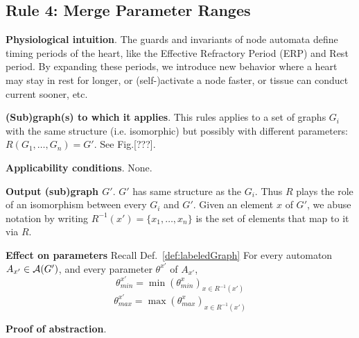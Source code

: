 
%
%

\subsection{Rule 4: Merge Parameter Ranges}
\textbf{Physiological intuition}. 
The guards and invariants of node automata define timing periods of the heart, like the Effective Refractory Period (ERP) and Rest period. 
By expanding these periods, we introduce new behavior where a heart may stay in rest for longer, or (self-)activate a node faster, or tissue can conduct current sooner, etc.

\textbf{(Sub)graph(s) to which it applies}.
This rules applies to a set of graphs $G_i$ with the same structure (i.e. isomorphic) but possibly with different parameters: $R(G_1,\ldots,G_n) = G'$.
See Fig.[???].

\textbf{Applicability conditions}.
None.

\textbf{Output (sub)graph $G'$}.
$G'$ has same structure as the $G_i$.
Thus $R$ plays the role of an isomorphism between every $G_i$ and $G'$.
Given an element $x$ of $G'$, we abuse notation by writing $R^{-1}(x') = \{x_1,\dots,x_n\}$ is the set of elements that map to it via $R$.

\textbf{Effect on parameters}
Recall Def.~\ref{def:labeledGraph}
For every automaton $A_{x'} \in \mathcal{A}(G')$, and every parameter $\theta^{x'}$ of $A_{x'}$, 
\[\theta_{min}^{x'} = \min(\theta^x_{min})_{x \in R^{-1}(x') }\]
\[\theta_{max}^{x'} = \max(\theta^x_{max})_{x \in R^{-1}(x') }\]

\textbf{Proof of abstraction}.
%


